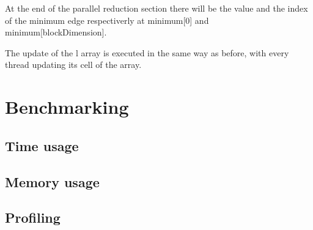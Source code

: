 \documentclass[
	a4paper, %
	12pt, %
]{class}
\begin{document}
At the end of the parallel reduction section there will be the value and the index of the minimum edge respectiverly at minimum[0] and minimum[blockDimension].

The update of the l array is executed in the same way as before, with every thread updating its cell of the array.

\section{Benchmarking}

\subsection{Time usage}

\subsection{Memory usage}

\subsection{Profiling}

\newpage
\printbibliography %

\end{document}

